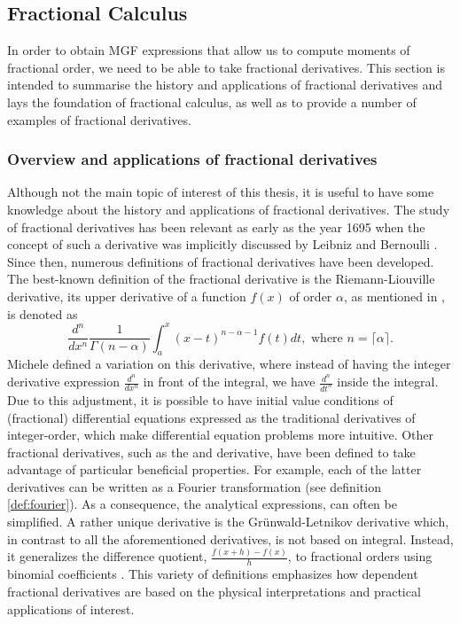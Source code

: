 \subsection{Fractional Calculus}\label{s:calculus}
In order to obtain MGF expressions that allow us to compute moments of fractional order, we need to be able to take fractional derivatives. This section is intended to summarise the history and applications of fractional derivatives and lays the foundation of fractional calculus, as well as to provide a number of examples of fractional derivatives.
\subsubsection{Overview and applications of fractional derivatives}\label{ss:calculus_introduction}
Although not the main topic of interest of this thesis, it is useful to have some knowledge about the history and applications of fractional derivatives. The study of fractional derivatives has been relevant as early as the year 1695 when the concept of such a derivative was implicitly discussed by Leibniz and Bernoulli \citep{katugampola2014}. Since then, numerous definitions of fractional derivatives have been developed. The best-known definition of the fractional derivative is the Riemann-Liouville derivative, its upper derivative of a function \(f(x)\) of order \(\alpha\), as mentioned in \citet{kilbas2006},  is denoted as 
\[\frac{d^n}{dx^n}\frac{1}{\Gamma(n -\alpha)} \int_{a}^{x} (x-t)^{n - \alpha -1} f(t) dt, \text{ where }n = \lceil\alpha \rceil. \]
Michele \citet{caputo1967} defined a variation on this derivative, where instead of having the integer derivative expression \(\displaystyle \frac{d^n}{dx^n}\) in front of the integral, we have \(\displaystyle \frac{d^n}{dt^n}\) inside the integral. Due to this adjustment, it is possible to have initial value conditions of (fractional) differential equations expressed as the traditional derivatives of integer-order, which make differential equation problems more intuitive. Other fractional derivatives, such as the \citet{hadamard1892} and \citet{riesz1949} derivative, have been defined to take advantage of particular beneficial properties. For example, each of the latter derivatives can be written as a Fourier transformation (see definition \ref{def:fourier}). As a consequence, the analytical expressions, can often be simplified. A rather unique derivative is the Grünwald-Letnikov derivative which, in contrast to all the aforementioned derivatives, is not based on integral. Instead, it generalizes the difference quotient, \(\frac{f(x+h) - f(x)}{h}\),  to fractional orders using binomial coefficients \citep{atici2021}. This variety of definitions emphasizes how dependent fractional derivatives are based on the physical interpretations and practical applications of interest.
